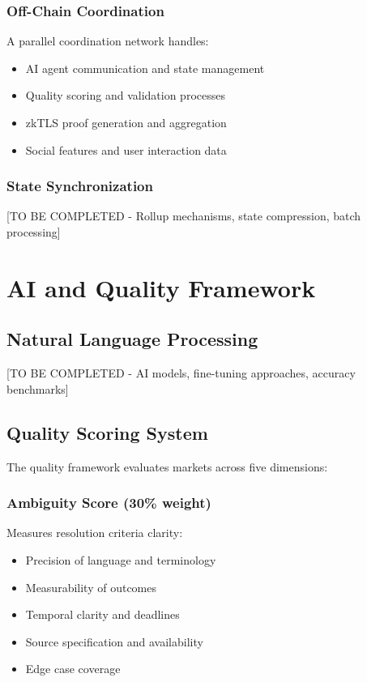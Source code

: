 \documentclass[11pt,a4paper]{article}
\begin{document}
\subsubsection{Off-Chain Coordination}
A parallel coordination network handles:
\begin{itemize}
    \item AI agent communication and state management
    \item Quality scoring and validation processes
    \item zkTLS proof generation and aggregation
    \item Social features and user interaction data
\end{itemize}

\subsubsection{State Synchronization}
[TO BE COMPLETED - Rollup mechanisms, state compression, batch processing]

\section{AI and Quality Framework}

\subsection{Natural Language Processing}
[TO BE COMPLETED - AI models, fine-tuning approaches, accuracy benchmarks]

\subsection{Quality Scoring System}

The quality framework evaluates markets across five dimensions:

\subsubsection{Ambiguity Score (30\% weight)}
Measures resolution criteria clarity:
\begin{itemize}
    \item Precision of language and terminology
    \item Measurability of outcomes
    \item Temporal clarity and deadlines
    \item Source specification and availability
    \item Edge case coverage
\end{itemize}
\end{document}

